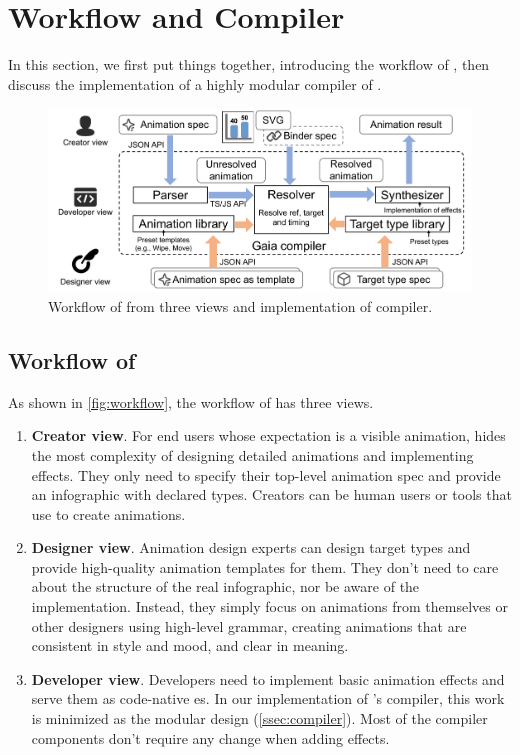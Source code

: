 \section{Workflow and \gaia{} Compiler}
\label{sec:workflow}

In this section, we first put things together, introducing the workflow of \gaia{}, then discuss the implementation of a highly modular compiler of \gaia{}.

\begin{figure}[h]
  \centering
  \includegraphics[width=0.9\linewidth]{figs/workflow.pdf}
  \caption{Workflow of \gaia{} from three views and implementation of \gaia{} compiler.}
  \label{fig:workflow}
\end{figure}

\subsection{Workflow of \gaia{}}


As shown in \autoref{fig:workflow}, the workflow of \gaia{} has three views.

\begin{enumerate}
\item \textbf{Creator view}.
For end users whose expectation is a visible animation, \gaia{} hides the most complexity of designing detailed animations and implementing effects. 
They only need to specify their top-level animation spec and provide an infographic with declared types. 
Creators can be human users or tools that use \gaia{} to create animations.

\item \textbf{Designer view}.
Animation design experts can design target types and provide high-quality animation templates for them.
They don't need to care about the structure of the real infographic, nor be aware of the implementation. 
Instead, they simply focus on animations from themselves or other designers using high-level grammar, creating animations that are consistent in style and mood, and clear in meaning.

\item \textbf{Developer view}.
Developers need to implement basic animation effects and serve them as code-native \aniclass{}es. In our implementation of \gaia{}'s compiler, this work is minimized as the modular design (\autoref{ssec:compiler}).
Most of the \gaia{} compiler components don't require any change when adding effects.

\end{enumerate}

